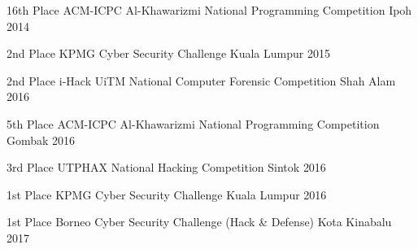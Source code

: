 \begin{cvhonors}

  \cvhonor
    {16th Place}
    {ACM-ICPC Al-Khawarizmi National Programming Competition}
    {Ipoh}
    {2014}

  \cvhonor
    {2nd Place}
    {KPMG Cyber Security Challenge}
    {Kuala Lumpur}
    {2015}

  \cvhonor
    {2nd Place}
    {i-Hack UiTM National Computer Forensic Competition}
    {Shah Alam}
    {2016}
        
  \cvhonor
    {5th Place}
    {ACM-ICPC Al-Khawarizmi National Programming Competition}
    {Gombak}
    {2016}
        
  \cvhonor
    {3rd Place}
    {UTPHAX National Hacking Competition}
    {Sintok}
    {2016}
            
  \cvhonor
    {1st Place}
    {KPMG Cyber Security Challenge}
    {Kuala Lumpur}
    {2016}

  \cvhonor
    {1st Place}
    {Borneo Cyber Security Challenge (Hack \& Defense)}
    {Kota Kinabalu}
    {2017}

\end{cvhonors}



